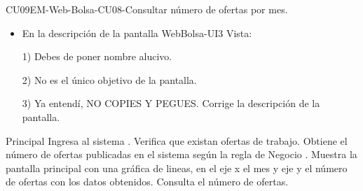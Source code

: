 \begin{UseCase}{CU09}{EM-Web-Bolsa-CU08-Consultar número de ofertas por mes.}
{\begin{itemize}
						1) En el paso 1: No puedes decir que ingresa al sistema, pues esta pntalla se obtiene después de eso. 

						2) Paso 2 y 3: ¿Con solo obtener la info de las ofertas tenemos mágicamente todo?

						3) El caso de uso habla sobre consultar el número de ofertas, se liga con la gráfica, en qué momento se hace referencia a las gráficas y la manera en que se construyen.

						4) Como sabemos, una TP, es para que el programador sepa cómo obtener cada dato y cómo generar las salidas, la gráfca y los datos que muestra, son salidas, tienes que explicar como se manejan esos datos, si se promedian, si se suman, si se restan, etc (con base a una regla de negocio que debes escribir), y la manera en que se va a construír y cómo se va a presentar (estructura, ejes, datos mostrados) al usuario. 
				\item En la descripción de la pantalla WebBolsa-UI3 Vista:

						1) Debes de poner nombre alucivo.

						2) No es el único objetivo de la pantalla. 
						
						3) Ya entendí, NO COPIES Y PEGUES. Corrige la descripción de la pantalla.
			\end{itemize}
 		}
	\end{UseCase}
	\newpage
	
	\begin{UCtrayectoria}{Principal}
	\UCpaso[\UCactor] Ingresa al sistema .
	\UCpaso Verifica que existan ofertas de trabajo.
	\UCpaso Obtiene el número de ofertas publicadas en el sistema según la regla de Negocio .
	\UCpaso Muestra la pantalla principal  con una gráfica de lineas, en el eje x el mes y eje y el número de ofertas con los datos obtenidos.
 	\UCpaso Consulta el número de ofertas.
	

	\end{UCtrayectoria}


